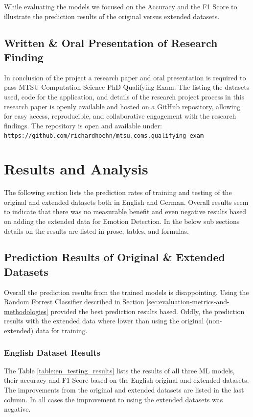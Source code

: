 \documentclass[11pt]{article}
\begin{document}
While evaluating the models we focused on the Accuracy and the F1 Score to illustrate the prediction results of the original versus extended datasets.

\subsection{Written \& Oral Presentation of Research Finding}
In conclusion of the project a research paper and oral presentation is required to pass MTSU Computation Science PhD Qualifying Exam. The listing the datasets used, code for the application, and details of the research project process in this research paper is openly available and hosted on a GitHub repository, allowing for easy access, reproducible, and collaborative engagement with the research findings. The repository is open and available under: \texttt{https://github.com/richardhoehn/mtsu.coms.qualifying-exam}\cite{Hoehn_Improving_Emotion_Detection_2023}

\clearpage
\section{Results and Analysis}
\label{sec:results-and-analysis}
The following section lists the prediction rates of training and testing of the original and extended datasets both in English and German. Overall results seem to indicate that there was no measurable benefit and even negative results based on adding the extended data for Emotion Detection. In the below sub sections details on the results are listed in prose, tables, and formulas.

\subsection{Prediction Results of Original \& Extended Datasets}
Overall the prediction results from the trained models is disappointing. Using the Random Forrest Classifier described in Section \ref{sec:evaluation-metrics-and-methodologies} provided the best prediction results based. Oddly, the prediction results with the extended data where lower than using the original (non-extended) data for training.

\subsubsection{English Dataset Results}
The Table \ref{table:en_testing_results} lists the results of all three ML models, their accuracy and F1 Score based on the English original and extended datasets. The improvements from the original and extended datasets are listed in the last column. In all cases the improvement to using the extended datasets was negative.
\end{document}
